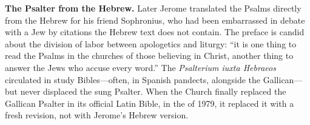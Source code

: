 \textbf{The Psalter from the Hebrew.} Later Jerome translated the Psalms
directly from the Hebrew for his friend Sophronius, who had been
embarrassed in debate with a Jew by citations the Hebrew text does not
contain. The preface is candid about the division of labor between
apologetics and liturgy: ``it is one thing to read the Psalms in the
churches of those believing in Christ, another thing to answer the Jews
who accuse every word.'' The \textit{Psalterium iuxta Hebraeos} circulated in study
Bibles---often, in Spanish pandects, alongside the Gallican---but never
displaced the sung Psalter. When the Church finally replaced the Gallican
Psalter in its official Latin Bible, in the  of 1979,
it replaced it with a fresh revision, not with Jerome's Hebrew
version.
